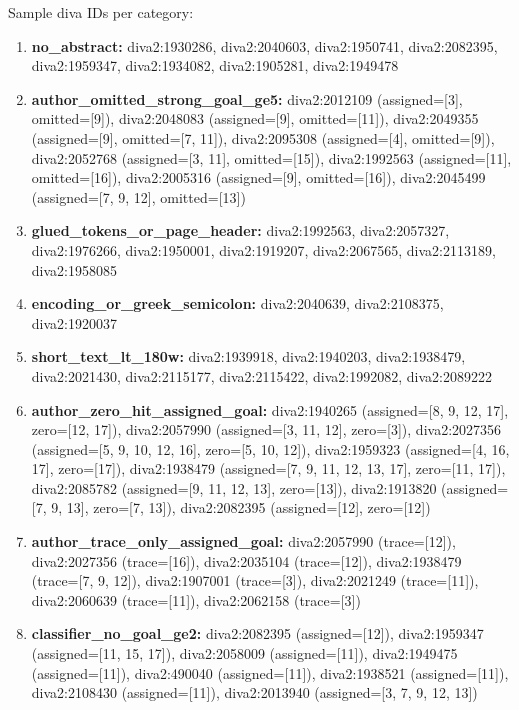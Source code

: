 Sample diva IDs per category:
\begin{enumerate}
\item \textbf{no\_abstract:} diva2:1930286, diva2:2040603, diva2:1950741, diva2:2082395, diva2:1959347, diva2:1934082, diva2:1905281, diva2:1949478

\item \textbf{author\_omitted\_strong\_goal\_ge5:} diva2:2012109 (assigned=[3], omitted=[9]), diva2:2048083 (assigned=[9], omitted=[11]), diva2:2049355 (assigned=[9], omitted=[7, 11]), diva2:2095308 (assigned=[4], omitted=[9]), diva2:2052768 (assigned=[3, 11], omitted=[15]), diva2:1992563 (assigned=[11], omitted=[16]), diva2:2005316 (assigned=[9], omitted=[16]), diva2:2045499 (assigned=[7, 9, 12], omitted=[13])

\item \textbf{glued\_tokens\_or\_page\_header:} diva2:1992563, diva2:2057327, diva2:1976266, diva2:1950001, diva2:1919207, diva2:2067565, diva2:2113189, diva2:1958085

\item \textbf{encoding\_or\_greek\_semicolon:} diva2:2040639, diva2:2108375, diva2:1920037

\item \textbf{short\_text\_lt\_180w:} diva2:1939918, diva2:1940203, diva2:1938479, diva2:2021430, diva2:2115177, diva2:2115422, diva2:1992082, diva2:2089222

\item \textbf{author\_zero\_hit\_assigned\_goal:} diva2:1940265 (assigned=[8, 9, 12, 17], zero=[12, 17]), diva2:2057990 (assigned=[3, 11, 12], zero=[3]), diva2:2027356 (assigned=[5, 9, 10, 12, 16], zero=[5, 10, 12]), diva2:1959323 (assigned=[4, 16, 17], zero=[17]), diva2:1938479 (assigned=[7, 9, 11, 12, 13, 17], zero=[11, 17]), diva2:2085782 (assigned=[9, 11, 12, 13], zero=[13]), diva2:1913820 (assigned=[7, 9, 13], zero=[7, 13]), diva2:2082395 (assigned=[12], zero=[12])

\item \textbf{author\_trace\_only\_assigned\_goal:} diva2:2057990 (trace=[12]), diva2:2027356 (trace=[16]), diva2:2035104 (trace=[12]), diva2:1938479 (trace=[7, 9, 12]), diva2:1907001 (trace=[3]), diva2:2021249 (trace=[11]), diva2:2060639 (trace=[11]), diva2:2062158 (trace=[3])

\item \textbf{classifier\_no\_goal\_ge2:} diva2:2082395 (assigned=[12]), diva2:1959347 (assigned=[11, 15, 17]), diva2:2058009 (assigned=[11]), diva2:1949475 (assigned=[11]), diva2:490040 (assigned=[11]), diva2:1938521 (assigned=[11]), diva2:2108430 (assigned=[11]), diva2:2013940 (assigned=[3, 7, 9, 12, 13])
\end{enumerate}

